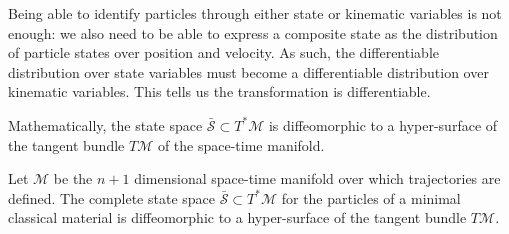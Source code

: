 \documentclass[smallextended]{svjour3}
\numberwithin{equation}{section}
\begin{document}
Being able to identify particles through either state or kinematic variables is not enough: we also need to be able to express a composite state as the distribution of particle states over position and velocity. As such, the differentiable distribution over state variables must become a differentiable distribution over kinematic variables. This tells us the transformation is differentiable.

Mathematically, the state space $\bar{\mathcal{S}} \subset T^*\mathcal{M}$ is diffeomorphic to a hyper-surface of the tangent bundle $T\mathcal{M}$ of the space-time manifold.

\begin{prop}\label{prop:tangent_bundle}
	Let $\mathcal{M}$ be the $n+1$ dimensional space-time manifold over which trajectories are defined. The complete state space $\bar{\mathcal{S}} \subset T^*\mathcal{M}$ for the particles of a minimal classical material is diffeomorphic to a hyper-surface of the tangent bundle $T\mathcal{M}$.
\end{prop}
\end{document}
